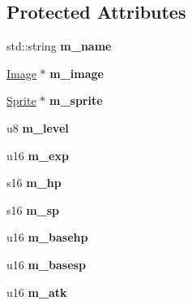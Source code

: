\subsection*{Protected Attributes}
\begin{DoxyCompactItemize}
\item 
\hypertarget{classBattler_a9d7fe96eca5e2180869483099bdd0094}{std\-::string {\bfseries m\-\_\-name}}\label{classBattler_a9d7fe96eca5e2180869483099bdd0094}

\item 
\hypertarget{classBattler_adbd67edafe168642e82a6a1fefa31c28}{\hyperlink{classImage}{Image} $\ast$ {\bfseries m\-\_\-image}}\label{classBattler_adbd67edafe168642e82a6a1fefa31c28}

\item 
\hypertarget{classBattler_abbfda09f9cef0aa37c498f0b7b8a7831}{\hyperlink{classSprite}{Sprite} $\ast$ {\bfseries m\-\_\-sprite}}\label{classBattler_abbfda09f9cef0aa37c498f0b7b8a7831}

\item 
\hypertarget{classBattler_a22bd77fbf98347dbefd7f49f2549b433}{u8 {\bfseries m\-\_\-level}}\label{classBattler_a22bd77fbf98347dbefd7f49f2549b433}

\item 
\hypertarget{classBattler_ac47b2c5a307c70e6708c7108e1f5b606}{u16 {\bfseries m\-\_\-exp}}\label{classBattler_ac47b2c5a307c70e6708c7108e1f5b606}

\item 
\hypertarget{classBattler_ad551db1917992557b238d8182300f2c0}{s16 {\bfseries m\-\_\-hp}}\label{classBattler_ad551db1917992557b238d8182300f2c0}

\item 
\hypertarget{classBattler_ad60f5de9a730d1cc111dba424a155da6}{s16 {\bfseries m\-\_\-sp}}\label{classBattler_ad60f5de9a730d1cc111dba424a155da6}

\item 
\hypertarget{classBattler_a6bed70c0ffe816267743ecc46c894684}{u16 {\bfseries m\-\_\-basehp}}\label{classBattler_a6bed70c0ffe816267743ecc46c894684}

\item 
\hypertarget{classBattler_a3d01739b74ce1237c4310f989dd9812c}{u16 {\bfseries m\-\_\-basesp}}\label{classBattler_a3d01739b74ce1237c4310f989dd9812c}

\item 
\hypertarget{classBattler_a93dd6534341a0f702ccca5502587c3ca}{u16 {\bfseries m\-\_\-atk}}\label{classBattler_a93dd6534341a0f702ccca5502587c3ca}


\end{DoxyCompactItemize}

